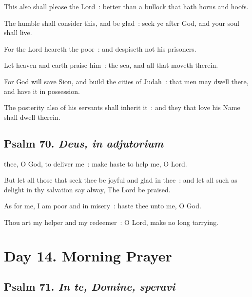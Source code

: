 This also shall please the Lord~: better than a bullock that hath horns and hoofs.\par
{}The humble shall consider this, and be glad~: seek ye after God, and your soul shall live.\par
{}For the Lord heareth the poor~: and despiseth not his prisoners.\par
{}Let heaven and earth praise him~: the sea, and all that moveth therein.\par
{}For God will save Sion, and build the cities of Judah~: that men may dwell there, and have it in possession.\par
{}The posterity also of his servants shall inherit it~: and they that love his Name shall dwell therein.\par

\subsection{Psalm 70. \textit{Deus, in adjutorium}}


 thee, O God, to deliver me~: make haste to help me, O Lord.\par
{}
But let all those that seek thee be joyful and glad in thee~: and let all such as delight in thy salvation say alway, The Lord be praised.\par
{}As for me, I am poor and in misery~: haste thee unto me, O God.\par
{}Thou art my helper and my redeemer~: O Lord, make no long tarrying.\par



\clearpage
\section*{Day 14. Morning Prayer}

\subsection{Psalm 71. \textit{In te, Domine, speravi}}

